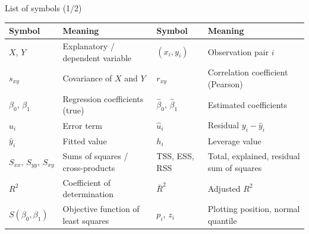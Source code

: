\documentclass[aspectratio=169,11pt]{beamer}
\begin{document}
\begin{frame}{List of symbols (1/2)}
  \begin{center}
    \small
    \renewcommand{\arraystretch}{1.15}
    \begin{tabular}{@{}l>{\raggedright\arraybackslash}p{4.5cm}l>{\raggedright\arraybackslash}p{4.5cm}@{}}
      \toprule
      \textbf{Symbol} & \textbf{Meaning} & \textbf{Symbol} & \textbf{Meaning} \\
      \midrule
      $X$, $Y$ & Explanatory / dependent variable & $(x_i, y_i)$ & Observation pair $i$ \\
      $s_{xy}$ & Covariance of $X$ and $Y$ & $r_{xy}$ & Correlation coefficient (Pearson) \\
      $\beta_0,\,\beta_1$ & Regression coefficients (true) & $\hat{\beta}_0,\,\hat{\beta}_1$ & Estimated coefficients \\
      $u_i$ & Error term & $\hat{u}_i$ & Residual $y_i-\hat y_i$ \\
      $\hat{y}_i$ & Fitted value & $h_i$ & Leverage value \\
      $S_{xx},\,S_{yy},\,S_{xy}$ & Sums of squares / cross-products & TSS, ESS, RSS & Total, explained, residual sum of squares \\
      $R^2$ & Coefficient of determination & $\bar R^2$ & Adjusted $R^2$ \\
      $S(\beta_0,\beta_1)$ & Objective function of least squares & $p_i$, $z_i$ & Plotting position, normal quantile \\
      \bottomrule
    \end{tabular}
  \end{center}
\end{frame}
\end{document}
